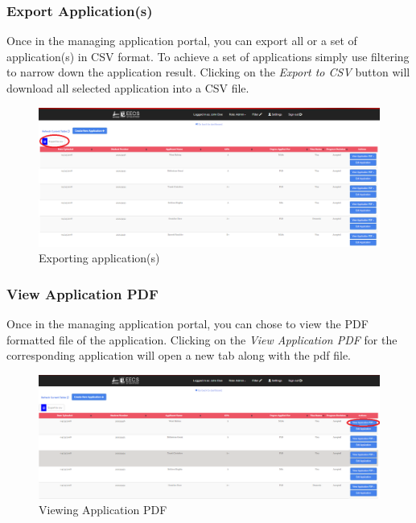 \documentclass[fontsize=12pt,paper=letter,twoside]{scrartcl}
\begin{document}
\clearpage
\subsubsection{Export Application(s)}
Once in the managing application portal, you can export all or a set of application(s) in CSV format. To achieve a set of applications simply use filtering to narrow down the application result. Clicking on the \emph{Export to CSV} button will download all selected application into a CSV file.

\begin{figure}[!htb]
\begin{center}
\includegraphics[width=.99\textwidth]{images/adm/ma/export_appl.png}
\end{center}
\caption{Exporting application(s)}
\label{fig:adm/export_appl}
\end{figure}

\clearpage
\subsubsection{View Application PDF}
Once in the managing application portal, you can chose to view the PDF formatted file of the application. Clicking on the \emph{View Application PDF} for the corresponding application will open a new tab along with the pdf file.

\begin{figure}[!htb]
\begin{center}
\includegraphics[width=.9\textwidth]{images/adm/ma/view_appl_app.png}
\end{center}
\caption{Viewing Application PDF}
\label{fig:adm/view_appl_app}
\end{figure}
\end{document}
